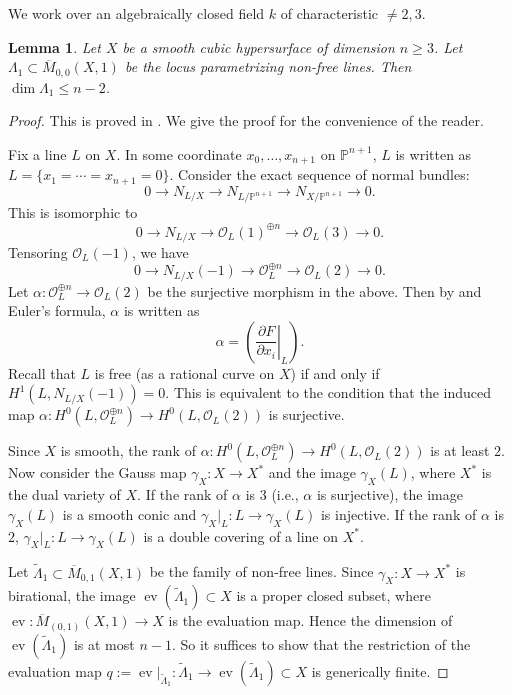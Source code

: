 \documentclass[dvipdfmx, 12pt, a4paper]{amsart}
\theoremstyle{plain}
\newtheorem{lem}[thm]{Lemma}
\theoremstyle{definition}
\theoremstyle{remark}
\newcommand{\ra}{\rightarrow}
\newcommand{\cO}{\mathcal{O}}
\newcommand{\bP}{\mathbb{P}}
\DeclareMathOperator{\ev}{ev}
\newcommand{\ol}{\overline}
\begin{document}
	
	We work over an algebraically closed field $k$ of characteristic $\neq2,3$.

	
	\begin{lem}\label{DimofNonFreeLines}
		Let $X$ be a smooth cubic hypersurface of dimension $n\geq3$. Let $\Lambda_1\subset\ol{M}_{0,0}(X,1)$ be the locus parametrizing non-free lines. Then $\dim\Lambda_1\leq n-2$.
	\end{lem}
	
		\begin{proof}
			This is proved in \cite[Chapter 2, Lemma 2.12]{Huybrechts2023geometry}. We give the proof for the convenience of the reader.
			
			Fix a line $L$ on $X$. In some coordinate $x_0,\ldots,x_{n+1}$ on $\bP^{n+1}$, $L$ is written as $L=\{x_1=\cdots=x_{n+1}=0\}$. Consider the exact sequence of normal bundles:
			$$0\ra N_{L/X}\ra N_{L/\bP^{n+1}}\ra N_{X/\bP^{n+1}}\ra0.$$
			This is isomorphic to
			$$0\ra N_{L/X}\ra\cO_L(1)^{\oplus n}\ra\cO_L(3)\ra0.$$
			Tensoring $\cO_L(-1)$, we have
			$$0\ra N_{L/X}(-1)\ra\cO_L^{\oplus n}\ra\cO_L(2)\ra0.$$
			Let $\alpha:\cO_L^{\oplus n}\ra\cO_L(2)$ be the surjective morphism in the above. Then by \cite[Corollary 6.16]{3264} and Euler's formula, $\alpha$ is written as
			$$\alpha=\left(\left.\frac{\partial F}{\partial x_i}\right|_L\right).$$
			Recall that $L$ is free (as a rational curve on $X$) if and only if $H^1(L,N_{L/X}(-1))=0$. This is equivalent to the condition that the induced map $\alpha:H^0(L,\cO_L^{\oplus n})\ra H^0(L,\cO_L(2))$ is surjective.
			
			Since $X$ is smooth, the rank of $\alpha:H^0(L,\cO_L^{\oplus n})\ra H^0(L,\cO_L(2))$ is at least $2$. Now consider the Gauss map $\gamma_X:X\ra X^*$ and the image $\gamma_X(L)$, where $X^*$ is the dual variety of $X$. If the rank of $\alpha$ is $3$ (i.e., $\alpha$ is surjective), the image $\gamma_X(L)$ is a smooth conic and $\gamma_X|_L:L\ra\gamma_X(L)$ is injective. If the rank of $\alpha$ is $2$, $\gamma_X|_L:L\ra\gamma_X(L)$ is a double covering of a line on $X^*$.
			
			Let $\widetilde{\Lambda}_1\subset\ol{M}_{0,1}(X,1)$ be the family of non-free lines. Since $\gamma_X:X\ra X^*$ is birational, the image $\ev(\widetilde{\Lambda}_1)\subset X$ is a proper closed subset, where $\ev:\ol{M}_{(0,1)}(X,1)\ra X$ is the evaluation map. Hence the dimension of $\ev(\widetilde{\Lambda}_1)$ is at most $n-1$. So it suffices to show that the restriction of the evaluation map $q:=\ev|_{\widetilde{\Lambda}_1}:\widetilde{\Lambda}_1\ra\ev(\widetilde{\Lambda}_1)\subset X$ is generically finite.
			

\end{proof}
\end{document}
